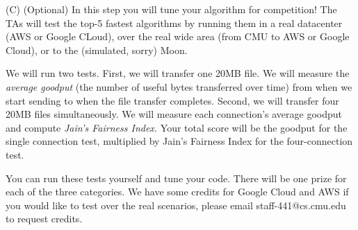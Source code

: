 \vspace{10pt}

\noindent (C) (Optional) In this step you will tune your algorithm for competition! The TAs will test the top-5 fastest algorithms by running them in a real datacenter (AWS or Google CLoud), over the real wide area (from CMU to AWS or Google Cloud), or to the (simulated, sorry) Moon.

We will run two tests. First, we will transfer one 20MB file. We will measure the {\it average goodput} (the number of useful bytes transferred over time) from when we start sending to when the file transfer completes. Second, we will transfer four 20MB files simultaneously. We will measure each connection's average goodput and compute {\it Jain's Fairness Index.} Your total score will be the goodput for the single connection test, multiplied by Jain's Fairness Index for the four-connection test.

You can run these tests yourself and tune your code. There will be one prize for each of the three categories. We have some credits for Google Cloud and AWS if you would like to test over the real scenarios, please email staff-441@cs.cmu.edu to request credits.


